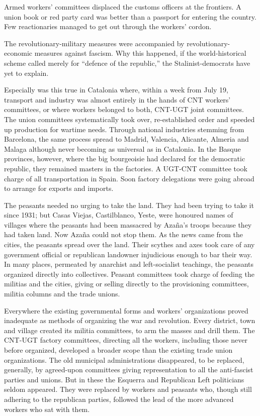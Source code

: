 Armed workers’ committees displaced the customs officers at the frontiers. A union book or red party card was better than a passport for entering the country. Few reactionaries managed to get out through the workers’ cordon.

The revolutionary-military measures were accompanied by revolutionary-economic measures against fascism. Why this happened, if the world-historical scheme called merely for ``defence of the republic,'' the Stalinist-democrats have yet to explain.

Especially was this true in Catalonia where, within a week from July 19, transport and industry was almost entirely in the hands of CNT workers’ committees, or where workers belonged to both, CNT-UGT joint committees. The union committees systematically took over, re-established order and speeded up production for wartime needs. Through national industries stemming from Barcelona, the same process spread to Madrid, Valencia, Alicante, Almeria and Malaga although never becoming as universal as in Catalonia. In the Basque provinces, however, where the big bourgeoisie had declared for the democratic republic, they remained masters in the factories. A UGT-CNT committee took charge of all transportation in Spain. Soon factory delegations were going abroad to arrange for exports and imports.

The peasants needed no urging to take the land. They had been trying to take it since 1931; but Casas Viejas, Castilblanco, Yeste, were honoured names of villages where the peasants had been massacred by Azaña’s troops because they had taken land. Now Azaña could not stop them. As the news came from the cities, the peasants spread over the land. Their scythes and axes took care of any government official or republican landowner injudicious enough to bar their way. In many places, permeated by anarchist and left-socialist teachings, the peasants organized directly into collectives. Peasant committees took charge of feeding the militias and the cities, giving or selling directly to the provisioning committees, militia columns and the trade unions.

Everywhere the existing governmental forms and workers’ organizations proved inadequate as methods of organizing the war and revolution. Every district, town and village created its militia committees, to arm the masses and drill them. The CNT-UGT factory committees, directing all the workers, including those never before organized, developed a broader scope than the existing trade union organizations. The old municipal administrations disappeared, to be replaced, generally, by agreed-upon committees giving representation to all the anti-fascist parties and unions. But in these the Esquerra and Republican Left politicians seldom appeared. They were replaced by workers and peasants who, though still adhering to the republican parties, followed the lead of the more advanced workers who sat with them.

